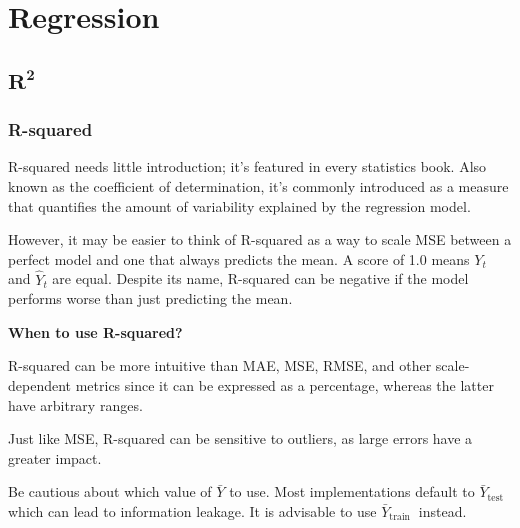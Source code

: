 \chapter{Regression}
\section{$\mathbf{R^2}$}
\subsection{R-squared}
\thispagestyle{customstyle}



R-squared needs little introduction; it's featured in every statistics book. Also known as the coefficient of determination, it's commonly introduced as a measure that quantifies the amount of variability explained by the regression model.

\begin{center}
\end{center}

However, it may be easier to think of R-squared as a way to scale MSE between a perfect model and one that always predicts the mean. A score of 1.0 means $Y_t$ and $\hat{Y}_t$ are equal. Despite its name, R-squared can be negative if the model performs worse than just predicting the mean.

\textbf{When to use R-squared?}

R-squared can be more intuitive than MAE, MSE, RMSE, and other scale-dependent metrics since it can be expressed as a percentage, whereas the latter have arbitrary ranges.

{
\item Just like MSE, R-squared can be sensitive to outliers, as large errors have a greater impact.
\item Be cautious about which value of $\bar{Y}$ to use. Most implementations default to $\bar{Y}_{\text {test }}$ which can lead to information leakage. It is advisable to use $\bar{Y}_{\text {train }}$ instead.
}


